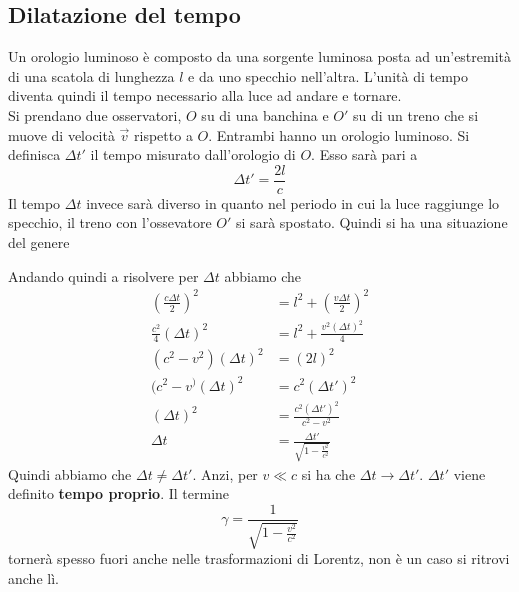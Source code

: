 \subsection{Dilatazione del tempo}
Un orologio luminoso è composto da una sorgente luminosa posta ad un'estremità di una scatola di 
lunghezza $l$ e da uno specchio nell'altra. L'unità di tempo diventa quindi il tempo necessario alla
luce ad andare e tornare.\\
Si prendano due osservatori, $O$ su di una banchina e $O'$ su di un treno che si muove di velocità
$\vec{v}$ rispetto a $O$. Entrambi hanno un orologio luminoso. Si definisca $\Delta t'$ il tempo
misurato dall'orologio di $O$. Esso sarà pari a
\begin{equation*}
  \Delta t' = \frac{2l}{c}
\end{equation*}
Il tempo $\Delta t$ invece sarà diverso in quanto nel periodo in cui la luce raggiunge lo specchio,
il treno con l'ossevatore $O'$ si sarà spostato. Quindi si ha una situazione del genere
\begin{center}
\end{center}
Andando quindi a risolvere per $\Delta t$ abbiamo che
\begin{align*}
  {\left( \frac{c\Delta t}{2} \right)}^2&=l^2+{\left( \frac{v\Delta t}{2} \right)}^2\\
  \frac{c^2}{4}{(\Delta t)}^2&=l^2+\frac{v^2{(\Delta t)}^2}{4}\\
  (c^2-v^2){(\Delta t)}^2&={(2l)}^2\\
  (c^2-v^){(\Delta t)}^2 &= c^2{(\Delta t')}^2\\
  {(\Delta t)}^2&= \frac{c^2{(\Delta t')}^2}{c^2-v^2}\\
  \Delta t &= \frac{\Delta t'}{\sqrt{1-\frac{v^2}{c^2}}}
\end{align*}
Quindi abbiamo che $\Delta t\neq\Delta t'$. Anzi, per $v\ll c$ si ha che $\Delta t \to \Delta t'$.
$\Delta t'$ viene definito \textbf{tempo proprio}. Il termine
\begin{equation*}
  \gamma = \frac{1}{\sqrt{1-\frac{v^2}{c^2}}}
\end{equation*}
tornerà spesso fuori anche nelle trasformazioni di Lorentz, non è un caso si ritrovi anche lì.

